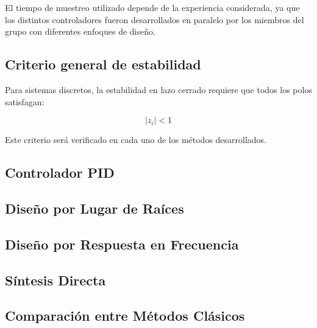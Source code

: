 El tiempo de muestreo utilizado depende de la experiencia considerada, ya que los distintos controladores fueron desarrollados en paralelo por los miembros del grupo con diferentes enfoques de diseño.

\subsection{Criterio general de estabilidad}

Para sistemas discretos, la estabilidad en lazo cerrado requiere que todos los polos satisfagan:

\[
|z_i| < 1
\]

Este criterio será verificado en cada uno de los métodos desarrollados.

\subsection{Controlador PID}



\balance
\clearpage

\subsection{Diseño por Lugar de Raíces}




\clearpage
\balance
\subsection{Diseño por Respuesta en Frecuencia}




\balance
\clearpage
\subsection{Síntesis Directa \cite{Fadali2020}}




\subsection{Comparación entre Métodos Clásicos}




\balance
\clearpage
